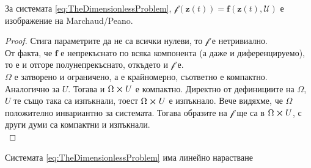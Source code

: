\begin{proposition}
За системата \eqref{eq:TheDimensionlessProblem}, $\mathscr{f}(\mathbf{z}(t))=\mathbf{f}(\mathbf{z}(t), \mathscr{U})$ е изображение на Marchaud/Peano.
\end{proposition}


\begin{proof}

  Стига параметрите да не са всички нулеви, то $\mathscr{f}$ е нетривиално. \\
  От факта, че $\mathbf{f}$ е непрекъснато по всяка компонента (а даже и диференцируемо), то е и отгоре полунепрекъснато, откъдето и $\mathscr{f}$ е. \\
  $\Omega$ е затворено и ограничено, а е крайномерно, съответно е компактно. Аналогично за $U$. Тогава и $\Omega \cross U$ е компактно. Директно от дефинициите на $\Omega$, $U$ те също така са изпъкнали, тоест $\Omega \cross U$ е изпъкнало. Вече видяхме, че $\Omega$ положително инвариантно за системата. Тогава образите на $\mathscr{f}$ ще са в $\Omega \cross U$, с други думи са компактни и изпъкнали. \\
\end{proof}

\begin{proposition}
  Системата \eqref{eq:TheDimensionlessProblem} има линейно нарастване
\end{proposition}

